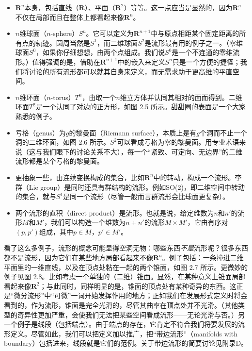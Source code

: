 \begin{itemize}
\item $\mathbf{R}^n$本身，包括直线（$\mathbf{R}$）、平面（$\mathbf{R}^2$）等等。这一点应当是显然的，因为$\mathbf{R}^n$不仅在局部而且在整体上都看起来像$\mathbf{R}^n$。
\item $n$维球面（$n$-sphere）$S^n$。它可以定义为$\mathbf{R}^{n+1}$中与原点相距某个固定距离的所有点的轨迹。圆周当然是$S^1$，而二维球面$S^2$是流形最有用的例子之一。（零维球面$S^0$，如果你仔细想想，由两个点组成。我们说$S^0$是一个不连通的零维流形。）值得强调的是，借助在$\mathbf{R}^{n+1}$中的嵌入来定义$S^n$只是一个方便的捷径；我们将讨论的所有流形都可以就其自身来定义，而无需求助于更高维的平直空间。
\item $n$维环面（$n$-torus）$T^n$，由取一个$n$维立方体并认同其相对的面而得到。二维环面$T^2$是一个认同了对边的正方形，如图 2.5 所示。甜甜圈的表面是一个大家熟悉的例子。
\item 亏格（genus）为$g$的黎曼面（Riemann surface），本质上是有$g$个洞而不止一个洞的二维环面，如图 2.6 所示。$S^2$可以看成亏格为零的黎曼面。用专业术语来说（这与我们眼下的讨论关系不大），每一个“紧致、可定向、无边界”的二维流形都是某个亏格的黎曼面。
\item 更抽象一些，由连续变换构成的集合，比如$\mathbf{R}^n$中的转动，构成一个流形。李群（Lie group）是同时还具有群结构的流形。例如SO(2)，即二维空间中转动的集合，就与$S^1$是同一个流形（尽管一般而言群流形会比球面更复杂）。
\item 两个流形的直积（direct product）是流形。也就是说，给定维数为$n$和$n'$的流形$M$和$M'$，我们可以构造一个维数为$n+n'$的流形$M\times M'$，它由有序对$(p,p')$组成，其中$p\in M$，$p'\in M'$。
\end{itemize}



看了这么多例子，流形的概念可能显得空洞无物：哪些东西\emph{不是}流形呢？很多东西都不是流形，因为它们在某些地方局部看起来不像$\mathbf{R}^n$。例子包括：一条撞进二维平面里的一维直线，以及在顶点处粘在一起的两个锥面，如图 2.7 所示。更微妙的例子见图 2.8。比如考虑一个单独的（二维）锥面。显然，在某种意义上锥面局部看起来像$\mathbf{R}^2$；与此同时，同样明显的是，锥面的顶点处有某种奇异的东西。这正是“微分流形”中“可微”一词开始发挥作用的地方；正如我们在发展形式定义时将会看到的，作为流形，锥面是完全光滑的，尽管其曲率在顶点处并不光滑。（其他类型的奇异性更加严重，会使我们无法把某些空间看成流形——无论光滑与否。）另一个例子是线段（包括端点）。由于端点的存在，它肯定不符合我们将要发展的流形定义。尽管如此，我们可以把定义加以推广，把“带边流形”（manifolds with boundary）包括进来，线段就是它们的范例。关于带边流形的简要讨论见附录D。

